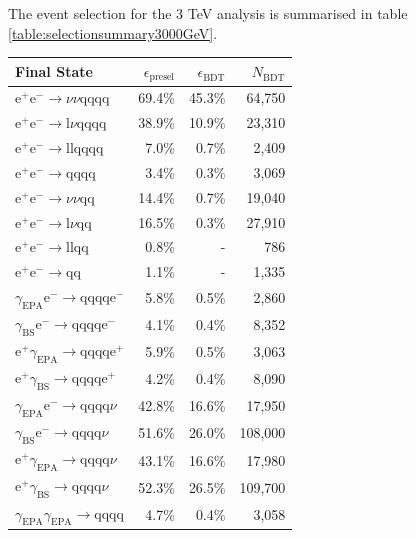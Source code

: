 The event selection for the 3 TeV analysis is summarised in table \ref{table:selectionsummary3000GeV}.

\begin{table}[h!]
\centering
\begin{tabular}{ l r r r }
\hline
Final State & $\epsilon_{\text{presel}}$ & $\epsilon_{\text{BDT}}$ & $N_{\text{BDT}}$ \\ 
\hline
$\text{e}^{+}\text{e}^{-} \rightarrow \nu{\nu}\text{qqqq}$ & 69.4\% & 45.3\% & 64,750 \\
$\text{e}^{+}\text{e}^{-} \rightarrow \text{l}\nu\text{qqqq}$ & 38.9\% & 10.9\% & 23,310 \\
$\text{e}^{+}\text{e}^{-} \rightarrow \text{llqqqq}$ & 7.0\% & 0.7\% & 2,409 \\
$\text{e}^{+}\text{e}^{-} \rightarrow \text{qqqq}$ & 3.4\% & 0.3\% & 3,069 \\
$\text{e}^{+}\text{e}^{-} \rightarrow \nu{\nu}\text{qq}$ & 14.4\% & 0.7\% & 19,040 \\
$\text{e}^{+}\text{e}^{-} \rightarrow \text{l}\nu\text{qq}$ & 16.5\% & 0.3\% & 27,910 \\
$\text{e}^{+}\text{e}^{-} \rightarrow \text{llqq}$ & 0.8\% & - & 786 \\
$\text{e}^{+}\text{e}^{-} \rightarrow \text{qq}$ & 1.1\% & - & 1,335 \\
$\gamma_{\text{EPA}}\text{e}^{-} \rightarrow \text{qqqq}\text{e}^{-}$ & 5.8\% & 0.5\% & 2,860 \\
$\gamma_{\text{BS}}\text{e}^{-} \rightarrow \text{qqqq}\text{e}^{-}$ & 4.1\% & 0.4\% & 8,352 \\
$\text{e}^{+}\gamma_{\text{EPA}} \rightarrow \text{qqqq}\text{e}^{+}$ & 5.9\% & 0.5\% & 3,063 \\
$\text{e}^{+}\gamma_{\text{BS}} \rightarrow \text{qqqq}\text{e}^{+}$ & 4.2\% & 0.4\% & 8,090 \\
$\gamma_{\text{EPA}}\text{e}^{-} \rightarrow \text{qqqq}\nu$ & 42.8\% & 16.6\% & 17,950 \\
$\gamma_{\text{BS}}\text{e}^{-} \rightarrow \text{qqqq}\nu$ & 51.6\% & 26.0\% & 108,000 \\
$\text{e}^{+}\gamma_{\text{EPA}} \rightarrow \text{qqqq}\nu$ & 43.1\% & 16.6\% & 17,980 \\
$\text{e}^{+}\gamma_{\text{BS}} \rightarrow \text{qqqq}\nu$ & 52.3\% & 26.5\% & 109,700 \\
$\gamma_{\text{EPA}}\gamma_{\text{EPA}} \rightarrow \text{qqqq}$ & 4.7\% & 0.4\% & 3,058 \\

\end{tabular}
\end{table}
